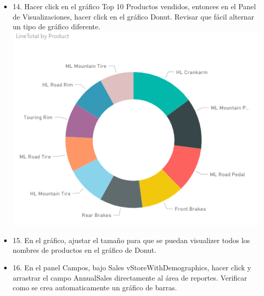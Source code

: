 \begin{itemize}
\item 14. Hacer click en el gráfico Top 10 Productos vendidos, entonces en el Panel de Visualizaciones, hacer click en el gráfico Donut. Revisar que fácil alternar un tipo de gráfico diferente. \\

\includegraphics[scale=0.8]{./Imagenes/image027}

\item 15. En el gráfico, ajustar el tamaño para que se puedan visualizer todos los nombres de productos en el gráfico de Donut. \\

\item 16. En el panel Campos, bajo Sales vStoreWithDemographics, hacer click y arrastrar el campo AnnualSales directamente al área de reportes. Verificar como se crea automaticamente un gráfico de barras. \\



\end{itemize}
